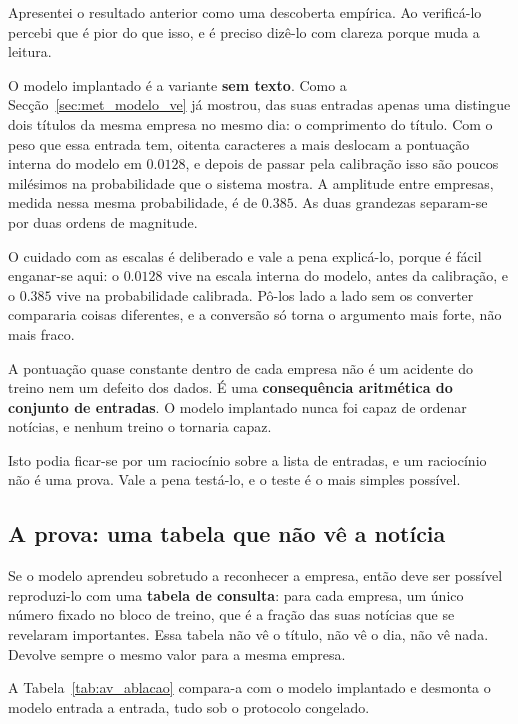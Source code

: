 Apresentei o resultado anterior como uma descoberta empírica. Ao verificá-lo percebi que é pior do
que isso, e é preciso dizê-lo com clareza porque muda a leitura.

O modelo implantado é a variante \textbf{sem texto}. Como a Secção~\ref{sec:met_modelo_ve} já
mostrou, das suas entradas apenas uma distingue dois títulos da mesma empresa no mesmo dia: o
comprimento do título. Com o peso que essa entrada tem, oitenta caracteres a mais deslocam a
pontuação interna do modelo em $0.0128$, e depois de passar pela calibração isso são poucos
milésimos na probabilidade que o sistema mostra. A amplitude entre empresas, medida nessa mesma
probabilidade, é de $0.385$. As duas grandezas separam-se por duas ordens de magnitude.

O cuidado com as escalas é deliberado e vale a pena explicá-lo, porque é fácil enganar-se aqui: o
$0.0128$ vive na escala interna do modelo, antes da calibração, e o $0.385$ vive na probabilidade
calibrada. Pô-los lado a lado sem os converter compararia coisas diferentes, e a conversão só torna
o argumento mais forte, não mais fraco.

\begin{tcolorbox}[colback=orange!5, colframe=orange!45, boxrule=0.5pt, arc=2pt]
A pontuação quase constante dentro de cada empresa não é um acidente do treino nem um defeito dos
dados. É uma \textbf{consequência aritmética do conjunto de entradas}. O modelo implantado nunca
foi capaz de ordenar notícias, e nenhum treino o tornaria capaz.
\end{tcolorbox}

Isto podia ficar-se por um raciocínio sobre a lista de entradas, e um raciocínio não é uma prova.
Vale a pena testá-lo, e o teste é o mais simples possível.

\subsection{A prova: uma tabela que não vê a notícia}
\label{sec:av_ablacao}

Se o modelo aprendeu sobretudo a reconhecer a empresa, então deve ser possível reproduzi-lo com
uma \textbf{tabela de consulta}: para cada empresa, um único número fixado no bloco de treino, que
é a fração das suas notícias que se revelaram importantes. Essa tabela não vê o título, não vê o
dia, não vê nada. Devolve sempre o mesmo valor para a mesma empresa.

A Tabela~\ref{tab:av_ablacao} compara-a com o modelo implantado e desmonta o modelo entrada a
entrada, tudo sob o protocolo congelado.


